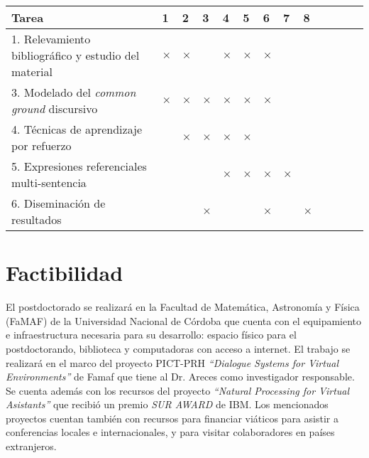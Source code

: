 \documentclass[10.9pt,a4paper]{article}
\begin{document}
{\footnotesize
\begin{center}
\begin{tabular}{|p{7cm}||p{2mm}|p{2mm}|p{2mm}|p{2mm}||p{2mm}|p{2mm}|p{2mm}|p{2mm
}||p{2mm}|p{2mm}|p{2mm}|p{2mm}||}
\hline
 \rowcolor[rgb]{0.8,0.8,0.8}\hspace{3.5cm}Tarea 
& 1 & 2 & 3 & 4 & 5 & 6 & 7 & 8 \\

\hline 1. Relevamiento bibliogr\'afico y estudio del material 
& $\times$ & $\times$ && $\times$ & $\times$ & $\times$ &&\\


\hline 3. Modelado del \emph{common ground} discursivo
& $\times$ & $\times$ & $\times$ & $\times$ & $\times$ & $\times$ &&\\

\hline 4. T\'ecnicas de aprendizaje por refuerzo
&& $\times$ & $\times$ & $\times$ & $\times$ &&&\\

\hline 5. Expresiones referenciales multi-sentencia
&&&& $\times$ & $\times$ & $\times$ & $\times$ &\\

\hline 6. Diseminaci\'on de resultados
&&& $\times$ &&& $\times$ && $\times$\\

\hline
\end{tabular}\end{center}
}



\section{Factibilidad}

El postdoctorado se realizar\'a en la Facultad de Matem\'atica, Astronom\'ia y 
F\'isica (FaMAF) de la Universidad Nacional de C\'ordoba que cuenta con el 
equipamiento e infraestructura necesaria para su desarrollo: espacio 
f\'isico para el postdoctorando, biblioteca y computadoras con acceso a 
internet.
El trabajo se realizar\'a en el marco del proyecto PICT-PRH 
\emph{``Dialogue Systems for Virtual Environments''} de Famaf
que tiene al Dr. Areces como investigador responsable. Se cuenta 
adem\'as con los recursos del proyecto \emph{``Natural Processing for Virtual Asistants''} que recibi\'o un premio
\emph{SUR AWARD} de IBM. 
Los mencionados proyectos cuentan tambi\'en con recursos para financiar 
vi\'aticos para asistir a conferencias locales e internacionales, y para 
visitar colaboradores en pa\'ises extranjeros.
\end{document}
